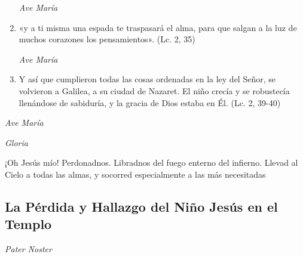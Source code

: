 \documentclass[a4paper,11pt, oneside]{report}
\begin{document}
\begin{enumerate}
          \textit{Ave María}

          \item «y a ti misma una espada te traspasará el alma, para que salgan a la luz de muchos corazones los pensamientos». (Lc. 2, 35)
          
          \textit{Ave María}

          \item Y así que cumplieron todas las cosas ordenadas en la ley del Señor, se volvieron a Galilea, a su ciudad de Nazaret. El niño crecía
          y se robustecía llenándose de sabiduría, y la gracia de Dios estaba en Él. (Lc. 2, 39-40)

        \end{enumerate}

        \textit{Ave María} \par
        \indent\textit{Gloria} \par
        \indent¡Oh Jesús mío! Perdonadnos. Libradnos del fuego enterno del infierno. Llevad al Cielo a todas las almas, y socorred especialmente a las más 
        necesitadas
            
      \subsection*{La Pérdida y Hallazgo del Niño Jesús en el Templo}
      
        \textit{Pater Noster}
\end{document}

